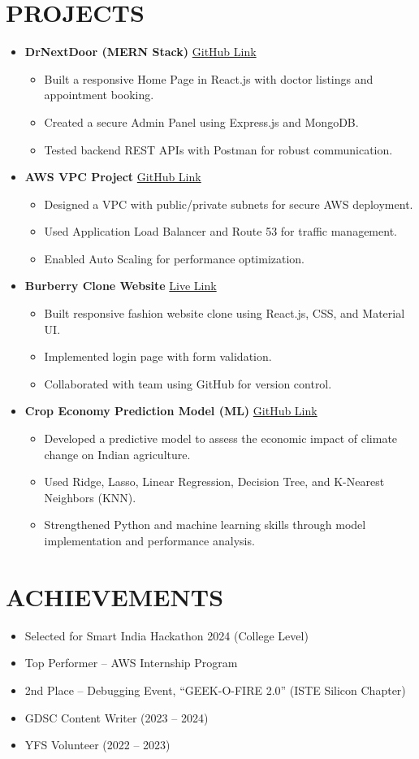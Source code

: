 \documentclass[a4paper,10pt]{article}
\newcommand{\resheading}[1]{\vspace{-5pt}\section*{\uppercase{#1}}\vspace{-6pt}}
\newcommand{\resitem}[1]{\item #1 \vspace{-4pt}}
\begin{document}
\resheading{Projects}
\begin{itemize}[leftmargin=0.15in, itemsep=8pt, topsep=1pt]

  \item \textbf{DrNextDoor (MERN Stack)} \hfill \href{https://github.com/swapnilshikha/DrNextDoor}{GitHub Link}
  \begin{itemize}[itemsep=2pt, topsep=1pt]
    \resitem{Built a responsive Home Page in React.js with doctor listings and appointment booking.}
    \resitem{Created a secure Admin Panel using Express.js and MongoDB.}
    \resitem{Tested backend REST APIs with Postman for robust communication.}
  \end{itemize}

  \item \textbf{AWS VPC Project} \hfill \href{https://github.com/swapnilshikha/AWS-Project}{GitHub Link}
  \begin{itemize}[itemsep=2pt, topsep=1pt]
    \resitem{Designed a VPC with public/private subnets for secure AWS deployment.}
    \resitem{Used Application Load Balancer and Route 53 for traffic management.}
    \resitem{Enabled Auto Scaling for performance optimization.}
  \end{itemize}

  \item \textbf{Burberry Clone Website} \hfill \href{https://coding-comandoes.github.io/Burberry-Clone/}{Live Link}
  \begin{itemize}[itemsep=2pt, topsep=1pt]
    \resitem{Built responsive fashion website clone using React.js, CSS, and Material UI.}
    \resitem{Implemented login page with form validation.}
    \resitem{Collaborated with team using GitHub for version control.}
  \end{itemize}

  \item \textbf{Crop Economy Prediction Model (ML)} \hfill \href{https://github.com/swapnilshikha/Climate_change_on_agriculture}{GitHub Link}
  \begin{itemize}[itemsep=2pt, topsep=1pt]
    \resitem{Developed a predictive model to assess the economic impact of climate change on Indian agriculture.}
    \resitem{Used Ridge, Lasso, Linear Regression, Decision Tree, and K-Nearest Neighbors (KNN).}
    \resitem{Strengthened Python and machine learning skills through model implementation and performance analysis.}
  \end{itemize}

\end{itemize}

\resheading{Achievements}
\begin{itemize}[leftmargin=0.15in, itemsep=2pt, topsep=1pt]
  \item Selected for Smart India Hackathon 2024 (College Level)
  \item Top Performer – AWS Internship Program
  \item 2nd Place – Debugging Event, “GEEK-O-FIRE 2.0” (ISTE Silicon Chapter)
  \item GDSC Content Writer (2023 – 2024)
  \item YFS Volunteer (2022 – 2023)
\end{itemize}
\end{document}
